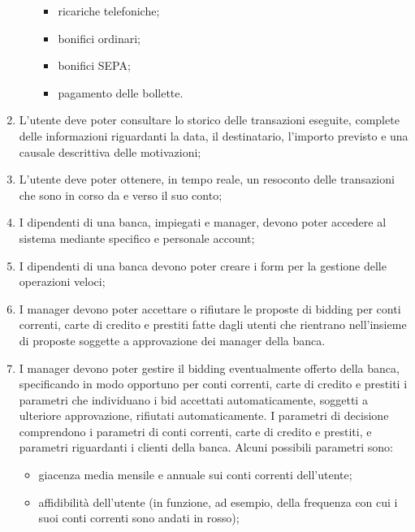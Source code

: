 \begin{enumerate}
\begin{enumerate}
			\begin{itemize}
				\item ricariche telefoniche;
				\item bonifici ordinari;
				\item bonifici SEPA;
				\item pagamento delle bollette.
			\end{itemize} 
	\end{enumerate}
	\item \label{itm:utente:funzionali:storico} L'utente deve poter consultare lo storico delle transazioni eseguite, complete delle informazioni riguardanti la data, il destinatario, l'importo previsto e una causale descrittiva delle motivazioni;
	\item \label{itm:utente:funzionali:resoconto} L'utente deve poter ottenere, in tempo reale, un resoconto delle transazioni che sono in corso da e verso il suo conto;
	\item \label{itm:utente:funzionali:dipendenti:accesso} I dipendenti di una banca, impiegati e manager, devono poter accedere al sistema mediante specifico e personale account;
	\item \label{itm:utente:funzionali:dipendenti:operazioni-veloci} I dipendenti di una banca devono poter creare i form per la gestione delle operazioni veloci;
	\item \label{itm:utente:funzionali:management:bidding:approvazione} I manager devono poter accettare o rifiutare le proposte di bidding per conti correnti, carte di credito e prestiti fatte dagli utenti che rientrano nell'insieme di proposte soggette a approvazione dei manager della banca.
	\item \label{itm:utente:funzionali:management:bidding:creazione} I manager devono poter gestire il bidding eventualmente offerto della banca, specificando in modo opportuno per conti correnti, carte di credito e prestiti i parametri che individuano i bid accettati automaticamente, soggetti a ulteriore approvazione, rifiutati automaticamente.
	I parametri di decisione comprendono i parametri di conti correnti, carte di credito e prestiti, e parametri riguardanti i clienti della banca.
	Alcuni possibili parametri sono:
		\begin{itemize}
			\item giacenza media mensile e annuale sui conti correnti dell'utente;
			\item affidibilit\`a dell'utente (in funzione, ad esempio, della frequenza con cui i suoi conti correnti sono andati in rosso);

\end{itemize}
\end{enumerate}
